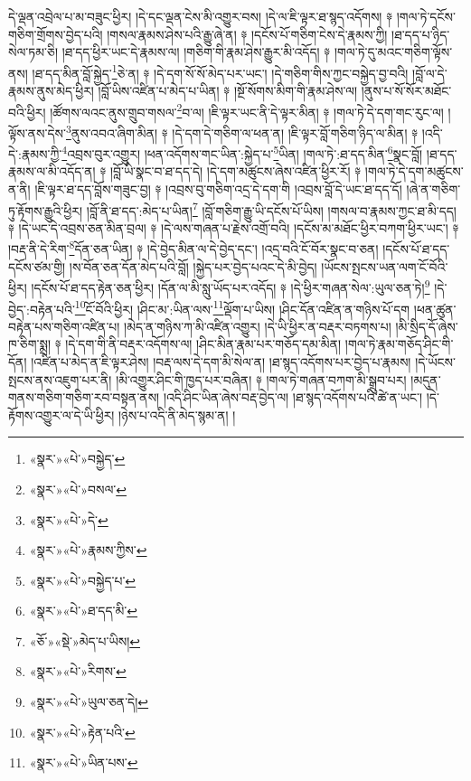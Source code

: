 དེ་ལྡན་འབྲེལ་པ་མ་བཟུང་ཕྱིར། །དེ་དང་ལྡན་ངེས་མི་འགྱུར་བས། །དེ་ལ་ཇི་ལྟར་ཐ་སྙད་འདོགས། ༈ །གལ་ཏེ་དངོས་གཅིག་གྲོགས་བྱེད་པའི། །གསལ་རྣམས་ཤེས་པའི་རྒྱུ་ཞེ་ན། ༈ །དངོས་པོ་གཅིག་ངེས་དེ་རྣམས་ཀྱི། །ཐ་དད་པ་ཉིད་སེལ་ཏམ་ཅི། །ཐ་དད་ཕྱིར་ཡང་དེ་རྣམས་ལ། །གཅིག་གི་རྣམ་ཤེས་རྒྱུར་མི་འདོད། ༈ །གལ་ཏེ་དུ་མའང་གཅིག་ལྟོས་ནས། །ཐ་དད་མིན་བློ་སྐྱེད་\footnote{«སྣར་»«པེ་»བསྐྱེད་}ཅེ་ན། ༈ །དེ་དག་སོ་སོ་མེད་པར་ཡང་། །དེ་གཅིག་གིས་ཀྱང་བསྐྱེད་བྱ་བའི། །བློ་ལ་དེ་རྣམས་ནུས་མེད་ཕྱིར། །བློ་ཡིས་འཛིན་པ་མེད་པ་ཡིན། ༈ །སྔོ་སོགས་མིག་གི་རྣམ་ཤེས་ལ། །ནུས་པ་སོ་སོར་མཐོང་བའི་ཕྱིར། །ཚོགས་ལའང་ནུས་གྲུབ་གསལ་\footnote{«སྣར་»«པེ་»བསལ་}བ་ལ། །ཇི་ལྟར་ཡང་ནི་དེ་ལྟར་མིན། ༈ །གལ་ཏེ་དེ་དག་གང་རུང་ལ། །ལྟོས་ནས་དེས་\footnote{«སྣར་»«པེ་»དེ་}ནུས་འབའ་ཞིག་མིན། ༈ །དེ་དག་དེ་གཅིག་ལ་ཕན་ན། །ཇི་ལྟར་བློ་གཅིག་ཉིད་ལ་མིན། ༈ །འདི་དེ་:རྣམས་ཀྱི་\footnote{«སྣར་»«པེ་»རྣམས་ཀྱིས་}འབྲས་བུར་འགྱུར། །ཕན་འདོགས་གང་ཡིན་:སྐྱེད་པ་\footnote{«སྣར་»«པེ་»བསྐྱེད་པ་}ཡིན། །གལ་ཏེ་:ཐ་དད་མིན་\footnote{«སྣར་»«པེ་»ཐ་དད་མི་}སྣང་བློ། །ཐ་དད་རྣམས་ལ་མི་འདོད་ན། ༈ །བློ་ཡི་སྣང་བ་ཐ་དད་དེ། །དེ་དག་མཚུངས་ཞེས་འཛིན་ཕྱིར་རོ། ༈ །གལ་ཏེ་དེ་དག་མཚུངས་ན་ནི། །ཇི་ལྟར་ཐ་དད་བློས་གཟུང་བྱ། ༈ །འབྲས་བུ་གཅིག་འདྲ་དེ་དག་གི །འབྲས་བློ་དེ་ཡང་ཐ་དད་དོ། །ཞེ་ན་གཅིག་ཏུ་རྟོགས་རྒྱུའི་ཕྱིར། །བློ་ནི་ཐ་དད་:མེད་པ་ཡིན།\footnote{«ཅོ་»«སྡེ་»མེད་པ་ཡིས།} །བློ་གཅིག་རྒྱུ་ཡི་དངོས་པོ་ཡིས། །གསལ་བ་རྣམས་ཀྱང་ཐ་མི་དད། ༈ །དེ་ཡང་དེ་འབྲས་ཅན་མིན་བྲལ། ༈ །དེ་ལས་གཞན་པ་རྗེས་འགྲོ་བའི། །དངོས་མ་མཐོང་ཕྱིར་བཀག་ཕྱིར་ཡང་། ༈ །བརྡ་ནི་དེ་རིག་\footnote{«སྣར་»«པེ་»རིགས་}དོན་ཅན་ཡིན། ༈ །དེ་བྱེད་མིན་ལ་དེ་བྱེད་དང་། །འདྲ་བའི་ངོ་བོར་སྣང་བ་ཅན། །དངོས་པོ་ཐ་དད་དངོས་ཙམ་གྱི། །ས་བོན་ཅན་དོན་མེད་པའི་བློ། །སྐྱེད་པར་བྱེད་པའང་དེ་མི་བྱེད། །ཡོངས་སྤངས་ཡན་ལག་ངོ་བོའི་ཕྱིར། །དངོས་པོ་ཐ་དད་རྟེན་ཅན་ཕྱིར། །དོན་ལ་མི་སླུ་ཡོད་པར་འདོད། ༈ །དེ་ཕྱིར་གཞན་སེལ་:ཡུལ་ཅན་ཏེ།\footnote{«སྣར་»«པེ་»ཡུལ་ཅན་དེ།} །དེ་བྱེད་:བརྟེན་པའི་\footnote{«སྣར་»«པེ་»རྟེན་པའི་}ངོ་བོའི་ཕྱིར། །ཤིང་མ་:ཡིན་ལས་\footnote{«སྣར་»«པེ་»ཡིན་པས་}ལྡོག་པ་ཡིས། །ཤིང་དོན་འཛིན་ན་གཉིས་པོ་དག །ཕན་ཚུན་བརྟེན་པས་གཅིག་འཛིན་པ། །མེད་ན་གཉིས་ཀ་མི་འཛིན་འགྱུར། །དེ་ཡི་ཕྱིར་ན་བརྡར་བཏགས་པ། །མི་སྲིད་དོ་ཞེས་ཁ་ཅིག་སྨྲ། ༈ །དེ་དག་གི་ནི་བརྡར་འདོགས་ལ། །ཤིང་མིན་རྣམ་པར་གཅོད་དམ་མིན། །གལ་ཏེ་རྣམ་གཅོད་ཤིང་གི་དོན། །འཛིན་པ་མེད་ན་ཇི་ལྟར་ཤེས། །བརྡ་ལས་དེ་དག་མི་སེལ་ན། །ཐ་སྙད་འདོགས་པར་བྱེད་པ་རྣམས། །དེ་ཡོངས་སྤངས་ནས་འཇུག་པར་ནི། །མི་འགྱུར་ཤིང་གི་ཁྱད་པར་བཞིན། ༈ །གལ་ཏེ་གཞན་བཀག་མི་སྒྲུབ་པར། །མདུན་གནས་གཅིག་གཅིག་རབ་བསྟན་ནས། །འདི་ཤིང་ཡིན་ཞེས་བརྡ་བྱེད་ལ། །ཐ་སྙད་འདོགས་པའི་ཚེ་ན་ཡང་། །དེ་རྟོགས་འགྱུར་ལ་དེ་ཡི་ཕྱིར། །ཉེས་པ་འདི་ནི་མེད་སྙམ་ན། །

